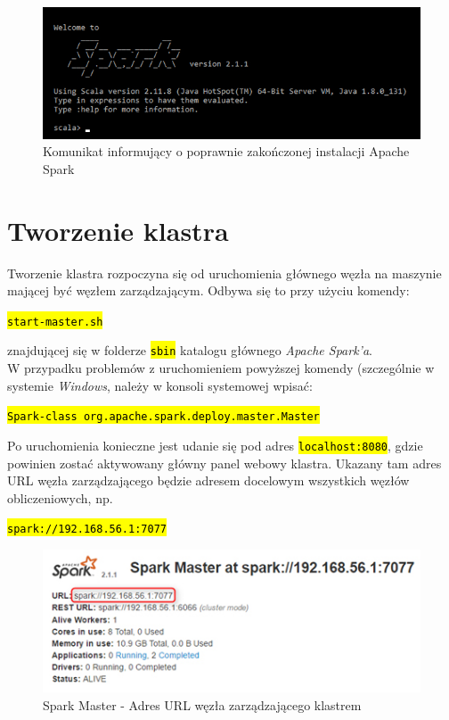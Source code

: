 \documentclass[a4paper,onecolumn,oneside,12pt]{memoir}
\begin{document}
{{\begin{figure}[h]
	\centering
	\includegraphics[width=1\linewidth]{spark-installed}
	\caption{Komunikat informujący o poprawnie zakończonej instalacji Apache Spark}
	\label{fig:stronaTytulowa}
\end{figure}



\pagebreak
\vspace*{1mm}
\section{Tworzenie klastra}
Tworzenie klastra rozpoczyna się od uruchomienia głównego węzła na maszynie
mającej być węzłem zarządzającym.
Odbywa się to przy użyciu komendy: \vspace{2mm}

\centerline{\texttt{\hl{start-master.sh}}}
\vspace{2mm} znajdującej się w folderze \texttt{\hl{sbin}} katalogu głównego \textit{Apache Spark'a}. \\
W przypadku problemów z uruchomieniem powyższej komendy (szczególnie w systemie \textit{Windows}, należy w konsoli systemowej wpisać: \vspace{2mm}

\centerline{\texttt{\hl{Spark-class org.apache.spark.deploy.master.Master}}}
\vspace{2mm}Po uruchomienia konieczne jest udanie się pod adres \texttt{\hl{localhost:8080}}, gdzie powinien zostać aktywowany główny panel webowy klastra. Ukazany tam adres URL węzła zarządzającego będzie adresem
docelowym wszystkich węzłów obliczeniowych, np.\vspace{2mm}
\centerline{\texttt{\hl{spark://192.168.56.1:7077}}}
\begin{figure}[h]
	\centering
	\includegraphics[width=1\linewidth]{spark-working}
	\caption{Spark Master - Adres URL węzła zarządzającego klastrem}
	\label{fig:stronaTytulowa}
\end{figure}

}}
\end{document}
